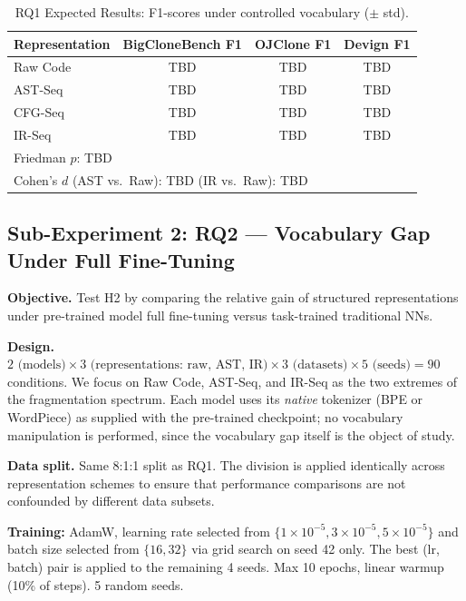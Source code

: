 \documentclass[pdflatex,sn-mathphys,Numbered]{sn-jnl}
\newcommand{\RQOneRawF}{TBD}        %
\newcommand{\RQOneASTF}{TBD}        %
\newcommand{\RQOneIRF}{TBD}         %
\newcommand{\RQOneCFGF}{TBD}        %
\newcommand{\RQOnePval}{TBD}        %
\newcommand{\RQOneEffAST}{TBD}      %
\newcommand{\RQOneEffIR}{TBD}       %
\newcommand{\BCB}{Big\-Clone\-Bench}
\newcommand{\OJC}{OJ\-Clone}
\newcommand{\Dev}{Devign}
\begin{document}
\begin{table}[tb]
\centering
\caption{RQ1 Expected Results: F1-scores under controlled vocabulary ($\pm$ std).}\label{tab:rq1}
\begin{tabular}{lccc}
\toprule
Representation & \BCB{} F1 & \OJC{} F1 & \Dev{} F1 \\
\midrule
Raw Code  & \RQOneRawF{} & \RQOneRawF{} & \RQOneRawF{} \\
AST-Seq   & \RQOneASTF{} & \RQOneASTF{} & \RQOneASTF{} \\
CFG-Seq   & \RQOneCFGF{} & \RQOneCFGF{} & \RQOneCFGF{} \\
IR-Seq    & \RQOneIRF{}  & \RQOneIRF{}  & \RQOneIRF{} \\
\midrule
\multicolumn{4}{l}{Friedman $p$: \RQOnePval{}} \\
\multicolumn{4}{l}{Cohen's $d$ (AST vs.\ Raw): \RQOneEffAST{} \quad (IR vs.\ Raw): \RQOneEffIR{}} \\
\bottomrule
\end{tabular}
\end{table}

\subsection{Sub-Experiment 2: RQ2 --- Vocabulary Gap Under Full Fine-Tuning}

\textbf{Objective.} Test H2 by comparing the relative gain of structured representations under pre-trained model full fine-tuning versus task-trained traditional NNs.

\textbf{Design.} $2 \text{ (models)} \times 3 \text{ (representations: raw, AST, IR)} \times 3 \text{ (datasets)} \times 5 \text{ (seeds)} = 90$ conditions. We focus on Raw Code, AST-Seq, and IR-Seq as the two extremes of the fragmentation spectrum. Each model uses its \emph{native} tokenizer (BPE or WordPiece) as supplied with the pre-trained checkpoint; no vocabulary manipulation is performed, since the vocabulary gap itself is the object of study.

\textbf{Data split.} Same 8:1:1 split as RQ1. The division is applied identically across representation schemes to ensure that performance comparisons are not confounded by different data subsets.

\textbf{Training:} AdamW, learning rate selected from $\{1\times 10^{-5}, 3\times 10^{-5}, 5\times 10^{-5}\}$ and batch size selected from $\{16, 32\}$ via grid search on seed 42 only. The best (lr, batch) pair is applied to the remaining 4 seeds. Max 10 epochs, linear warmup (10\% of steps). 5 random seeds.
\end{document}
